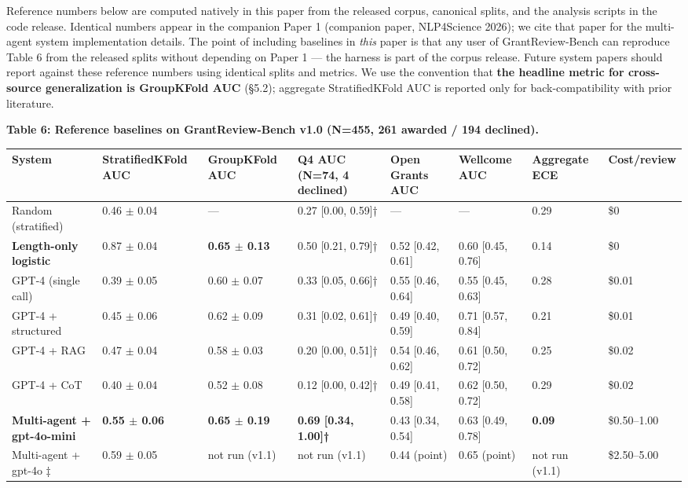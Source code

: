 \documentclass[11pt]{article}
\begin{document}
Reference numbers below are computed natively in this paper from the released corpus, canonical splits, and the analysis scripts in the code release. Identical numbers appear in the companion Paper 1 (companion paper, NLP4Science 2026); we cite that paper for the multi-agent system implementation details. The point of including baselines in \emph{this} paper is that any user of GrantReview-Bench can reproduce Table 6 from the released splits without depending on Paper 1 --- the harness is part of the corpus release. Future system papers should report against these reference numbers using identical splits and metrics. We use the convention that \textbf{the headline metric for cross-source generalization is GroupKFold AUC} (§5.2); aggregate StratifiedKFold AUC is reported only for back-compatibility with prior literature.

\textbf{Table 6: Reference baselines on GrantReview-Bench v1.0 (N=455, 261 awarded / 194 declined).}

\begin{table}[H]
\centering
\small
\begin{tabular}{llllllll}
\toprule
System & StratifiedKFold AUC & \textbf{GroupKFold AUC} & Q4 AUC (N=74, 4 declined) & Open Grants AUC & Wellcome AUC & Aggregate ECE & Cost/review \\
\midrule
Random (stratified) & 0.46 $\pm$ 0.04 & --- & 0.27 [0.00, 0.59]† & --- & --- & 0.29 & \$0 \\
\textbf{Length-only logistic} & 0.87 $\pm$ 0.04 & \textbf{0.65 $\pm$ 0.13} & 0.50 [0.21, 0.79]† & 0.52 [0.42, 0.61] & 0.60 [0.45, 0.76] & 0.14 & \$0 \\
GPT-4 (single call) & 0.39 $\pm$ 0.05 & 0.60 $\pm$ 0.07 & 0.33 [0.05, 0.66]† & 0.55 [0.46, 0.64] & 0.55 [0.45, 0.63] & 0.28 & \$0.01 \\
GPT-4 + structured & 0.45 $\pm$ 0.06 & 0.62 $\pm$ 0.09 & 0.31 [0.02, 0.61]† & 0.49 [0.40, 0.59] & 0.71 [0.57, 0.84] & 0.21 & \$0.01 \\
GPT-4 + RAG & 0.47 $\pm$ 0.04 & 0.58 $\pm$ 0.03 & 0.20 [0.00, 0.51]† & 0.54 [0.46, 0.62] & 0.61 [0.50, 0.72] & 0.25 & \$0.02 \\
GPT-4 + CoT & 0.40 $\pm$ 0.04 & 0.52 $\pm$ 0.08 & 0.12 [0.00, 0.42]† & 0.49 [0.41, 0.58] & 0.62 [0.50, 0.72] & 0.29 & \$0.02 \\
\textbf{Multi-agent + gpt-4o-mini} & \textbf{0.55 $\pm$ 0.06} & \textbf{0.65 $\pm$ 0.19} & \textbf{0.69 [0.34, 1.00]†} & 0.43 [0.34, 0.54] & 0.63 [0.49, 0.78] & \textbf{0.09} & \$0.50--1.00 \\
Multi-agent + gpt-4o ‡ & 0.59 $\pm$ 0.05 & not run (v1.1) & not run (v1.1) & 0.44 (point) & 0.65 (point) & not run (v1.1) & \$2.50--5.00 \\
\bottomrule
\end{tabular}
\end{table}
\end{document}
